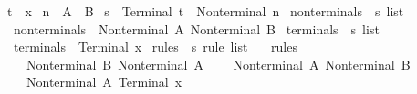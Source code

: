 \begin{isabellebody}
\isadelimdocument
%
\endisadelimdocument
%
\isatagdocument
%
\isamarkuptrue%
%
\endisatagdocument
{\isafolddocument}%
%
\isadelimdocument
%
\endisadelimdocument
{}\isamarkupfalse%
\ t{}\ {\isacharequal}{\kern0pt}\ x\isanewline
{}\isamarkupfalse%
\ n{}\ {\isacharequal}{\kern0pt}\ A\ {\isacharbar}{\kern0pt}\ B\isanewline
{}\isamarkupfalse%
\ s{}\ {\isacharequal}{\kern0pt}\ Terminal\ t{}\ {\isacharbar}{\kern0pt}\ Nonterminal\ n{}\isanewline
\isanewline
{}\isamarkupfalse%
\ nonterminals{}\ {\isacharcolon}{\kern0pt}{\isacharcolon}{\kern0pt}\ {\isachardoublequoteopen}s{}\ list{\isachardoublequoteclose}\ \isanewline
\ \ {\isachardoublequoteopen}nonterminals{}\ {\isacharequal}{\kern0pt}\ {\isacharbrackleft}{\kern0pt}Nonterminal\ A{\isacharcomma}{\kern0pt}\ Nonterminal\ B{\isacharbrackright}{\kern0pt}{\isachardoublequoteclose}\isanewline
\isanewline
{}\isamarkupfalse%
\ terminals{}\ {\isacharcolon}{\kern0pt}{\isacharcolon}{\kern0pt}\ {\isachardoublequoteopen}s{}\ list{\isachardoublequoteclose}\ \isanewline
\ \ {\isachardoublequoteopen}terminals{}\ {\isacharequal}{\kern0pt}\ {\isacharbrackleft}{\kern0pt}Terminal\ x{\isacharbrackright}{\kern0pt}{\isachardoublequoteclose}\isanewline
\isanewline
{}\isamarkupfalse%
\ rules{}\ {\isacharcolon}{\kern0pt}{\isacharcolon}{\kern0pt}\ {\isachardoublequoteopen}s{}\ rule\ list{\isachardoublequoteclose}\ \isanewline
\ \ {\isachardoublequoteopen}rules{}\ {\isacharequal}{\kern0pt}\ {\isacharbrackleft}{\kern0pt}\isanewline
\ \ \ \ {\isacharparenleft}{\kern0pt}Nonterminal\ B{\isacharcomma}{\kern0pt}\ {\isacharbrackleft}{\kern0pt}Nonterminal\ A{\isacharbrackright}{\kern0pt}{\isacharparenright}{\kern0pt}{\isacharcomma}{\kern0pt}\isanewline
\ \ \ \ {\isacharparenleft}{\kern0pt}Nonterminal\ A{\isacharcomma}{\kern0pt}\ {\isacharbrackleft}{\kern0pt}Nonterminal\ B{\isacharbrackright}{\kern0pt}{\isacharparenright}{\kern0pt}{\isacharcomma}{\kern0pt}\isanewline
\ \ \ \ {\isacharparenleft}{\kern0pt}Nonterminal\ A{\isacharcomma}{\kern0pt}\ {\isacharbrackleft}{\kern0pt}Terminal\ x{\isacharbrackright}{\kern0pt}{\isacharparenright}{\kern0pt}\isanewline
\ \ {\isacharbrackright}{\kern0pt}{\isachardoublequoteclose}\isanewline
\isanewline
{}\isamarkupfalse%

\end{isabellebody}
